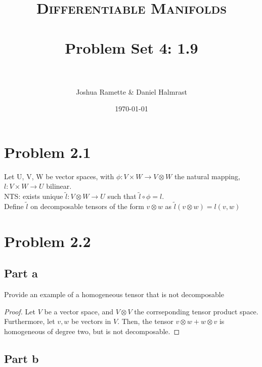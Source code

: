 \documentclass[paper=a4, fontsize=11pt]{scrartcl} %
\title{
\normalfont \normalsize 
\textsc{Differentiable Manifolds} \\ [25pt] %
\horrule{0.5pt} \\[0.4cm] %
\huge Problem Set 4: 1.9 \\ %
\horrule{2pt} \\[0.5cm] %
}
\author{Joshua Ramette \& Daniel Halmrast} %
\date{\normalsize\today} %
\numberwithin{equation}{section} %
\numberwithin{figure}{section} %
\numberwithin{table}{section} %
\begin{document}
\maketitle %


\section*{Problem 2.1}

Let U, V, W be vector spaces, with $\phi: V \times W \to V \otimes W$ the natural mapping, $ l: V \times W \to U$ bilinear. \\

NTS: exists unique $\widetilde{l}: V \otimes W \to U$ such that $\widetilde{l} \circ \phi = l$.\\

Define $\widetilde{l}$ on decomposable tensors of the form $v \otimes w$ as $\widetilde{l}(v \otimes w) = l(v,w)$





\section*{Problem 2.2}
\subsection{Part a}

Provide an example of a homogeneous tensor that is not decomposable

\begin{proof}
Let $V$ be a vector space, and $V \otimes V$ the corrseponding tensor product space.
Furthermore, let $v, w$ be vectors in $V$.
Then, the tensor $v \otimes w + w \otimes v$ is homogeneous of degree two, but is not decomposable.
\end{proof}

\subsection{Part b}
\end{document}
